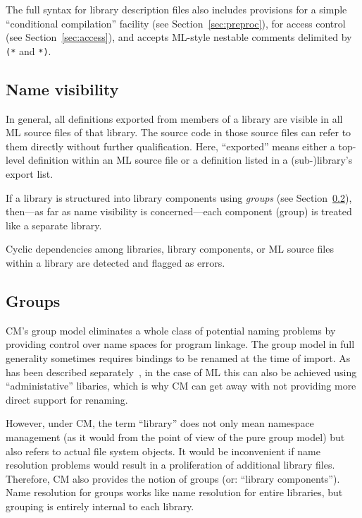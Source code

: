 \documentclass{article}
\begin{document}
The full syntax for library description files also includes provisions
for a simple ``conditional compilation'' facility (see
Section~\ref{sec:preproc}), for access control (see
Section~\ref{sec:access}), and accepts ML-style nestable comments
delimited by \verb|(*| and \verb|*)|.

\subsection{Name visibility}

In general, all definitions exported from members of a library are
visible in all ML source files of that library.  The source code in
those source files can refer to them directly without further
qualification.  Here, ``exported'' means either a top-level definition
within an ML source file or a definition listed in a (sub-)library's
export list.

If a library is structured into library components using {\em groups}
(see Section~\ref{sec:groups}), then---as far as name visibility is
concerned---each component (group) is treated like a separate library.

Cyclic dependencies among libraries, library components, or ML source
files within a library are detected and flagged as errors.

\subsection{Groups}
\label{sec:groups}

CM's group model eliminates a whole class of potential naming problems
by providing control over name spaces for program linkage.  The group
model in full generality sometimes requires bindings to be renamed at
the time of import. As has been described
separately~\cite{blume:appel:cm99}, in the case of ML this can also be
achieved using ``administative'' libaries, which is why CM can get
away with not providing more direct support for renaming.

However, under CM, the term ``library'' does not only mean namespace
management (as it would from the point of view of the pure group
model) but also refers to actual file system objects.  It would be
inconvenient if name resolution problems would result in a
proliferation of additional library files.  Therefore, CM also
provides the notion of groups (or: ``library components'').  Name
resolution for groups works like name resolution for entire libraries,
but grouping is entirely internal to each library.
\end{document}
